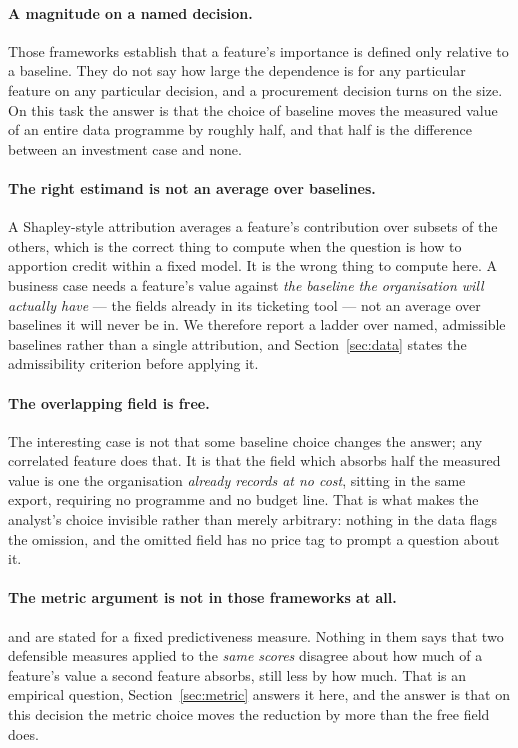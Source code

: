 \documentclass[preprint,12pt]{elsarticle}
\begin{document}
\paragraph{A magnitude on a named decision.}
Those frameworks establish that a feature's importance is defined only
relative to a baseline. They do not say how large the dependence is for any
particular feature on any particular decision, and a procurement decision
turns on the size. On this task the answer is that the choice of baseline
moves the measured value of an entire data programme by roughly half, and
that half is the difference between an investment case and none.

\paragraph{The right estimand is not an average over baselines.}
A Shapley-style attribution averages a feature's contribution over subsets of
the others, which is the correct thing to compute when the question is how to
apportion credit within a fixed model. It is the wrong thing to compute here.
A business case needs a feature's value against \emph{the baseline the
organisation will actually have} --- the fields already in its ticketing
tool --- not an average over baselines it will never be in. We therefore
report a ladder over named, admissible baselines rather than a single
attribution, and Section~\ref{sec:data} states the admissibility criterion
before applying it.

\paragraph{The overlapping field is free.}
The interesting case is not that some baseline choice changes the answer; any
correlated feature does that. It is that the field which absorbs half the
measured value is one the organisation \emph{already records at no cost},
sitting in the same export, requiring no programme and no budget line. That
is what makes the analyst's choice invisible rather than merely arbitrary:
nothing in the data flags the omission, and the omitted field has no price
tag to prompt a question about it.

\paragraph{The metric argument is not in those frameworks at all.}
\citet{williamson2023vimp} and \citet{covert2020sage} are stated for a fixed
predictiveness measure. Nothing in them says that two defensible measures
applied to the \emph{same scores} disagree about how much of a feature's value
a second feature absorbs, still less by how much. That is an empirical
question, Section~\ref{sec:metric} answers it here, and the answer is that on
this decision the metric choice moves the reduction by more than the free
field does.
\end{document}
